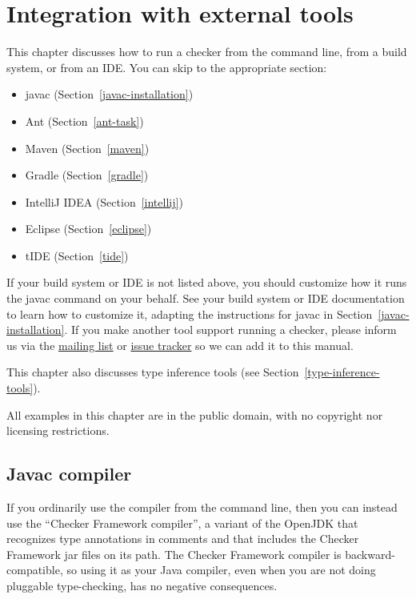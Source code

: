 \htmlhr
\chapter{Integration with external tools\label{external-tools}}

This chapter discusses how to run a checker from the command line, from a
build system, or from an IDE\@.  You can skip to the appropriate section:

\begin{itemize}
\item javac (Section~\ref{javac-installation})
\item Ant (Section~\ref{ant-task})
\item Maven (Section~\ref{maven})
\item Gradle (Section~\ref{gradle})
\item IntelliJ IDEA (Section~\ref{intellij})
\item Eclipse (Section~\ref{eclipse})
\item tIDE (Section~\ref{tide})
\end{itemize}

If your build system or IDE is not listed above, you should customize how
it runs the javac command on your behalf.  See your build system or IDE
documentation to learn how to
customize it, adapting the instructions for javac in Section~\ref{javac-installation}.
If you make another tool support running a checker, please
inform us via the
\href{https://groups.google.com/forum/#!forum/checker-framework-discuss}{mailing
  list} or
\href{https://github.com/typetools/checker-framework/issues}{issue tracker} so
we can add it to this manual.

This chapter also discusses type inference tools (see
Section~\ref{type-inference-tools}).

All examples in this chapter are in the public domain, with no copyright nor
licensing restrictions.


\section{Javac compiler\label{javac-installation}}

If you ordinarily use the  compiler from the command line, then you can
instead use the ``Checker Framework compiler'', a variant of the OpenJDK
 that recognizes type annotations in comments and that includes
the Checker Framework jar files on its path.
The Checker Framework compiler is backward-compatible, so using it as your
Java compiler, even when you are not doing pluggable type-checking, has no
negative consequences.

